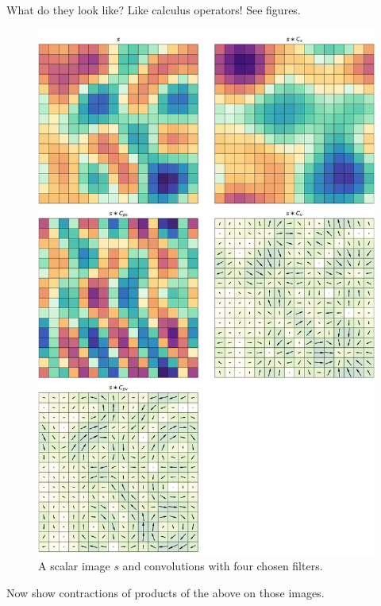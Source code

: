 \documentclass{article}
\theoremstyle{plain}
\begin{document}
What do they look like? Like calculus operators! See figures.
\begin{figure}
  \begin{mdframed}
  \color{captiongray}
  \begin{center}
    \includegraphics[width=\textwidth]{notebooks/monomials_1.png}
  \end{center}
    \caption{A scalar image $s$ and convolutions with four chosen filters.}
  \end{mdframed}
\end{figure}

Now show contractions of products of the above on those images.
\end{document}
